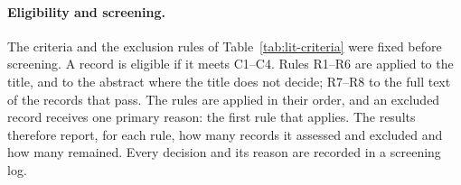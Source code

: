 \paragraph{Eligibility and screening.} The criteria and the exclusion rules of
Table~\ref{tab:lit-criteria} were fixed before screening. A record is eligible
if it meets C1--C4. Rules R1--R6 are applied to the title, and to the abstract
where the title does not decide; R7--R8 to the full text of the records that
pass. The rules are applied in their order, and an excluded record receives one
primary reason: the first rule that applies. The results therefore report, for
each rule, how many records it assessed and excluded and how many remained.
Every decision and its reason are recorded in a screening log.

